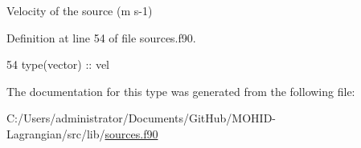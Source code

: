 Velocity of the source (m s-\/1) 



Definition at line 54 of file sources.\+f90.


\begin{DoxyCode}
54         \textcolor{keywordtype}{type}(vector) :: vel
\end{DoxyCode}


The documentation for this type was generated from the following file\+:\begin{DoxyCompactItemize}
\item 
C\+:/\+Users/administrator/\+Documents/\+Git\+Hub/\+M\+O\+H\+I\+D-\/\+Lagrangian/src/lib/\mbox{\hyperlink{sources_8f90}{sources.\+f90}}\end{DoxyCompactItemize}
